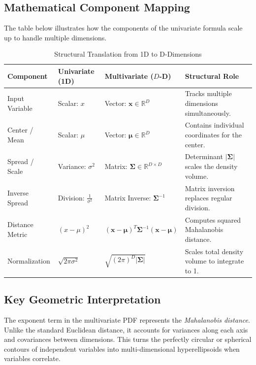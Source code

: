 \subsection{Mathematical Component Mapping}

The table below illustrates how the components of the univariate formula scale up to handle multiple dimensions.

\begin{table}[h!]
\centering
\small
\caption{Structural Translation from 1D to D-Dimensions}
\label{tab:gaussian_comparison}
\begin{tabularx}{\textwidth}{p{2.6cm} p{2.4cm} p{3.2cm} X}
\hline
\textbf{Component} & \textbf{Univariate (1D)} & \textbf{Multivariate ($D$-D)} & \textbf{Structural Role} \\ \hline
Input Variable & Scalar: $x$ & Vector: $\mathbf{x} \in \mathbb{R}^D$ & Tracks multiple dimensions simultaneously. \\ \hline
Center / Mean & Scalar: $\mu$ & Vector: $\boldsymbol{\mu} \in \mathbb{R}^D$ & Contains individual coordinates for the center. \\ \hline
Spread / Scale & Variance: $\sigma^2$ & Matrix: $\boldsymbol{\Sigma} \in \mathbb{R}^{D \times D}$ & Determinant $|\boldsymbol{\Sigma}|$ scales the density volume. \\ \hline
Inverse Spread & Division: $\frac{1}{\sigma^2}$ & Matrix Inverse: $\boldsymbol{\Sigma}^{-1}$ & Matrix inversion replaces regular division. \\ \hline
Distance Metric & $(x - \mu)^2$ & $(\mathbf{x} - \boldsymbol{\mu})^T \boldsymbol{\Sigma}^{-1} (\mathbf{x} - \boldsymbol{\mu})$ & Computes squared Mahalanobis distance. \\ \hline
Normalization & $\sqrt{2\pi\sigma^2}$ & $\sqrt{(2\pi)^D |\boldsymbol{\Sigma}|}$ & Scales total density volume to integrate to 1. \\ \hline
\end{tabularx}
\end{table}

\subsection{Key Geometric Interpretation}
The exponent term in the multivariate PDF represents the \textit{Mahalanobis distance}. Unlike the standard Euclidean distance, it accounts for variances along each axis and covariances between dimensions. This turns the perfectly circular or spherical contours of independent variables into multi-dimensional hyperellipsoids when variables correlate.